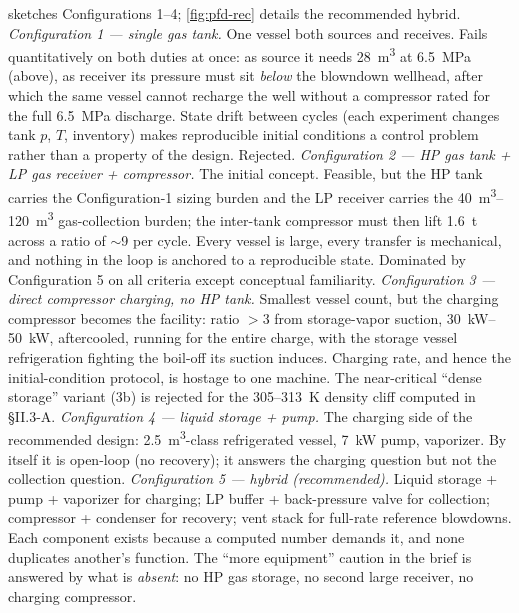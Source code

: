  sketches Configurations 1--4;
\cref{fig:pfd-rec} details the recommended hybrid.
\emph{Configuration 1 --- single gas tank.} One vessel both sources
and receives. Fails quantitatively on both duties at once: as source
it needs \SI{28}{m^3} at \SI{6.5}{MPa} (above), as receiver its
pressure must sit \emph{below} the blowndown wellhead, after which
the same vessel cannot recharge the well without a compressor rated
for the full \SI{6.5}{MPa} discharge. State drift between cycles
(each experiment changes tank $p$, $T$, inventory) makes reproducible
initial conditions a control problem rather than a property of the
design. Rejected.
\emph{Configuration 2 --- HP gas tank + LP gas receiver +
compressor.} The initial concept. Feasible, but the HP tank carries
the Configuration-1 sizing burden and the LP receiver carries the
\SIrange{40}{120}{m^3} gas-collection burden; the inter-tank
compressor must then lift \SI{1.6}{t} across a ratio of
$\sim$9 per cycle. Every vessel is large, every transfer is
mechanical, and nothing in the loop is anchored to a reproducible
state. Dominated by Configuration 5 on all criteria except
conceptual familiarity.
\emph{Configuration 3 --- direct compressor charging, no HP tank.}
Smallest vessel count, but the charging compressor becomes the
facility: ratio $>3$ from storage-vapor suction, \SIrange{30}{50}{kW},
aftercooled, running for the entire charge, with the storage vessel
refrigeration fighting the boil-off its suction induces. Charging
rate, and hence the initial-condition protocol, is hostage to one
machine. The near-critical ``dense storage'' variant (3b) is rejected
for the \SI{305}{}--\SI{313}{K} density cliff computed in \S II.3-A.
\emph{Configuration 4 --- liquid storage + pump.} The charging side
of the recommended design: \SI{2.5}{m^3}-class refrigerated vessel,
\SI{7}{kW} pump, vaporizer. By itself it is open-loop (no recovery);
it answers the charging question but not the collection question.
\emph{Configuration 5 --- hybrid (recommended).} Liquid storage +
pump + vaporizer for charging; LP buffer + back-pressure valve for
collection; compressor + condenser for recovery; vent stack for
full-rate reference blowdowns. Each component exists because a
computed number demands it, and none duplicates another's function.
The ``more equipment'' caution in the brief is answered by what is
\emph{absent}: no HP gas storage, no second large receiver, no
charging compressor.

